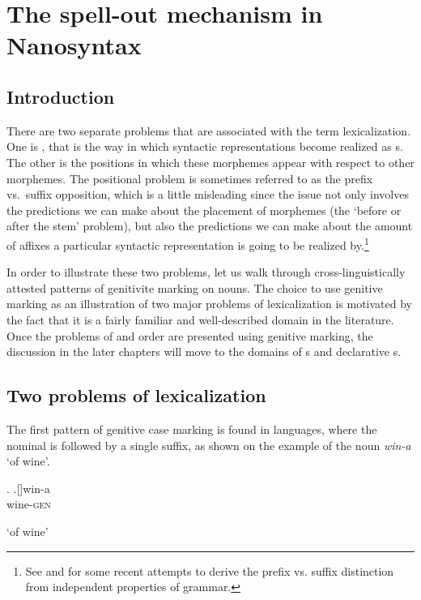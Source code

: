 \chapter{The spell-out mechanism in Nanosyntax}\label{chapter:nanosyntax}

\section{Introduction}

There are two separate problems that are associated with the term lexicalization. One is , that is the way in which syntactic representations become realized as s. The other is the positions in which these morphemes appear with respect to other morphemes. The positional problem  is sometimes referred to as the prefix vs.\ suffix opposition, which is a little misleading since the issue not only involves the predictions we can make about the placement of morphemes (the `before or after the stem' problem), but also the predictions we can make about the amount of affixes a particular syntactic representation is going to be realized by.\footnote{See \citet[135--138, 154--156]{DiSciullo2005} and \cite{Kayne2017} for some recent attempts to derive the prefix vs. suffix distinction from independent properties of grammar.
}%
\par
In order to illustrate these two problems, let us walk through cross-linguistically attested patterns of genitivite marking on nouns.
The choice to use genitive marking as an illustration of two major problems of lexicalization is motivated by the fact that it is a fairly familiar and well-described domain in the literature. Once the problems of  and  order are presented using genitive marking, the discussion in the later chapters will move to the domains of  s and declarative s.

\section{Two problems of lexicalization}

The first pattern of genitive case marking is found in  languages, where the nominal  is followed by a single suffix, as shown on the example of the  noun \textit{win-a} `of wine'.
 
\ex. 
\ag.[]\hspace{-20pt}win-a\\
\hspace{-20pt}wine-\textsc{gen}\\
\hspace{-20pt}\strut `of wine'


